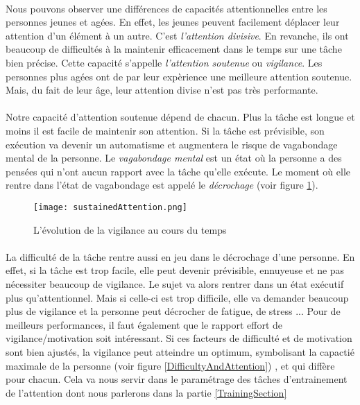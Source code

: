 \paragraph{}Nous pouvons observer une différences de capacités attentionnelles entre les personnes jeunes et agées. En effet, les jeunes peuvent facilement déplacer leur attention
d'un élément à un autre. C'est \emph{l'attention divisive}. En revanche, ils ont beaucoup de difficultés à la maintenir efficacement dans le temps sur une tâche bien précise. Cette capacité
s'appelle \emph{l'attention soutenue} ou \emph{vigilance}. Les personnes plus agées ont de par leur expèrience une meilleure attention soutenue. Mais, du fait de leur âge, leur attention divise n'est pas
très performante.

\paragraph{}Notre capacité d'attention soutenue dépend de chacun. Plus la tâche est longue et moins il est facile de maintenir son attention. Si la tâche est prévisible, son exécution
va devenir un automatisme et augmentera le risque de vagabondage mental de la personne. Le \emph{vagabondage mental} est un état où la personne a des pensées qui n'ont aucun rapport
avec la tâche qu'elle exécute. Le moment où elle rentre dans l'état de vagabondage est appelé le \emph{décrochage} (voir figure \ref{SustainedAttention}).

\begin{figure}[h]
    \begin{center}
    \texttt{[image: sustainedAttention.png]}
    \end{center}
    \caption{L'évolution de la vigilance au cours du temps}
\label{SustainedAttention}
\end{figure}

\paragraph{}La difficulté de la tâche rentre aussi en jeu dans le décrochage d'une personne. En effet, si la tâche est trop facile, elle peut devenir prévisible, ennuyeuse et ne
pas nécessiter beaucoup de vigilance. Le sujet va alors rentrer dans un état exécutif plus qu'attentionnel. Mais si celle-ci est trop difficile, elle va demander beaucoup plus de
vigilance et la personne peut décrocher de fatigue, de stress ... Pour de meilleurs performances, il faut également que le rapport effort de vigilance/motivation soit intéressant. Si
ces facteurs de difficulté et de motivation sont bien ajustés, la vigilance peut atteindre un optimum, symbolisant la capactié maximale de la personne (voir figure
\ref{DifficultyAndAttention}) , et qui diffère pour chacun. Cela va nous servir dans le paramétrage des tâches d'entrainement de l'attention dont nous parlerons dans la partie
\ref{TrainingSection}


